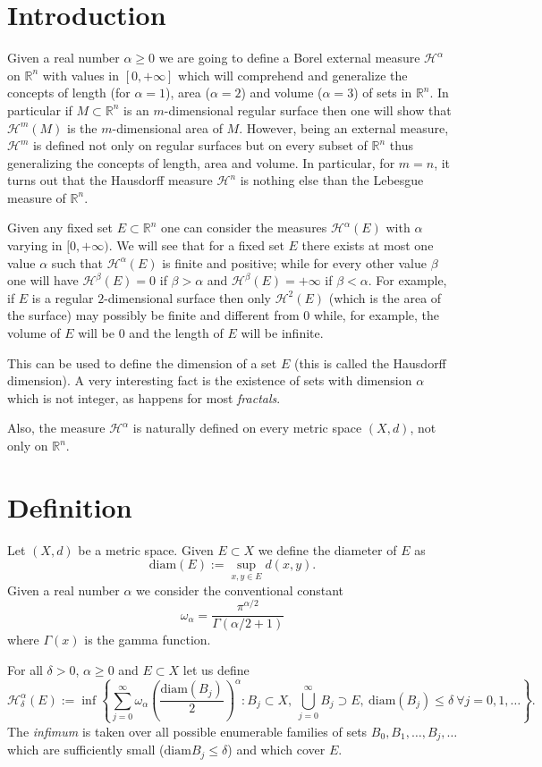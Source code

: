 \documentclass[12pt]{article}
\renewcommand{\H}{\mathcal H}
\newcommand{\R}{\mathbb R}
\newcommand{\diam}{\mathrm{diam}}
\begin{document}
\section*{Introduction}

Given a real number $\alpha\ge 0$ we are going to define a Borel external measure $\H^\alpha$ on $\R^n$ with values in $[0,+\infty]$ which will comprehend and generalize the concepts of length (for $\alpha=1$), area ($\alpha=2$) and volume ($\alpha=3$) of sets in $\R^n$.
In particular if $M\subset \R^n$ is an $m$-dimensional regular surface then one will show that 
$\H^m(M)$ is the $m$-dimensional area of $M$.
However, being an external measure, $\H^m$ is defined not only on regular surfaces but on every subset of $\R^n$ thus generalizing the concepts of length, area and volume. In particular, for $m=n$, it turns out that the Hausdorff measure $\H^n$ is nothing else than the Lebesgue measure of $\R^n$.

Given any fixed set $E\subset \R^n$ one can consider the measures $\H^\alpha(E)$ with $\alpha$ varying in $[0,+\infty)$. We will see that for a fixed set $E$ there exists at most one value $\alpha$ such that $\H^\alpha(E)$ is finite and positive; while for every other value $\beta$ one will have $\H^\beta(E)=0$ if $\beta>\alpha$ and $\H^\beta(E)=+\infty$ if $\beta<\alpha$.
For example, if $E$ is a regular $2$-dimensional surface then only $\H^2(E)$ (which is the area of the surface) may possibly be finite and different from $0$ while, for example, the volume of $E$ will be $0$ and the length of $E$ will be infinite.

This can be used to define the dimension of a set $E$ (this is called the Hausdorff dimension). A very interesting fact is the existence of sets with dimension $\alpha$ which is not integer, as happens for most \emph{fractals}.

Also, the measure $\H^\alpha$ is naturally defined on every metric space $(X,d)$, not only on $\R^n$. 

\section*{Definition}
Let $(X,d)$ be a metric space. 
Given $E\subset X$ we define the diameter of $E$ as
\[
  \mathrm{diam}(E) := \sup_{x,y\in E} d(x,y).
\]
Given a real number $\alpha$ we consider the conventional constant
\[
  \omega_\alpha=\frac{\pi^{\alpha/2}}{\Gamma(\alpha/2+1)}
\]
where $\Gamma(x)$ is the gamma function.

For all $\delta>0$, $\alpha\ge 0$ and $E\subset X$ let us define
\begin{equation}\label{defHdelta}
  \H^\alpha_\delta(E) := \inf \left\{\sum_{j=0}^\infty \omega_\alpha \left(\frac{\diam (B_j)} 2\right)^\alpha
\colon B_j\subset X,\ \bigcup_{j=0}^\infty B_j\supset E,\ 
\diam (B_j) \le \delta\ \forall j=0,1,\ldots
\right\}.
\end{equation}
The \emph{infimum} is taken over all possible enumerable families of sets $B_0, B_1, \ldots, B_j,\ldots$ which are sufficiently small ($\diam B_j \le \delta$) and which cover $E$.
\end{document}
